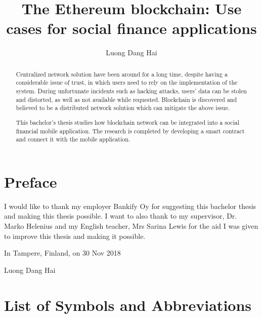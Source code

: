 \documentclass[twoside,numperchapter]{tutthesis} %
\author{Luong Dang Hai}
\title{The Ethereum blockchain: Use cases for social finance applications}
\begin{document}
\maketitle



\begin{abstract}

Centralized network solution have been around for a long time, despite having a considerable issue of trust, in which users need to rely on the implementation of the system. During unfortunate incidents such as hacking attacks, users' data can be stolen and distorted, as well as not available while requested. Blockchain is discovered and believed to be a distributed network solution which can mitigate the above issue.

This bachelor's thesis studies how blockchain network can be integrated into a social financial mobile application. The research is completed by developing a smart contract and connect it with the mobile application.

 
\end{abstract}


\chapter*{Preface}

I would like to thank my employer Bankify Oy for suggesting this bachelor thesis and making this thesis possible. I want to also thank to my supervisor, Dr. Marko Helenius and my English teacher, Mrs Sarina Lewis for the aid I was given to improve this thesis and making it possible.

\vspace{2\baselineskip}

In Tampere, Finland, on 30 Nov 2018

\vspace{2\baselineskip}

Luong Dang Hai



\tableofcontents

\listoffigures



\chapter*{List of Symbols and Abbreviations}
\end{document}
